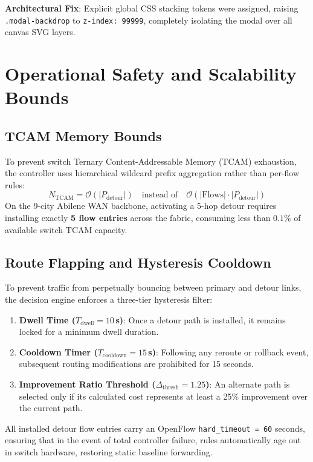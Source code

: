 \textbf{Architectural Fix}: Explicit global CSS stacking tokens were assigned, raising \texttt{.modal-backdrop} to \texttt{z-index: 99999}, completely isolating the modal over all canvas SVG layers.

\section{Operational Safety and Scalability Bounds}

\subsection{TCAM Memory Bounds}
To prevent switch Ternary Content-Addressable Memory (TCAM) exhaustion, the controller uses hierarchical wildcard prefix aggregation rather than per-flow rules:
\begin{equation}
  N_{\text{TCAM}} = \mathcal{O}(|P_{\text{detour}}|) \quad \text{instead of} \quad \mathcal{O}(|\text{Flows}| \cdot |P_{\text{detour}}|)
\end{equation}
On the 9-city Abilene WAN backbone, activating a 5-hop detour requires installing exactly \textbf{5 flow entries} across the fabric, consuming less than $0.1\%$ of available switch TCAM capacity.

\subsection{Route Flapping and Hysteresis Cooldown}
To prevent traffic from perpetually bouncing between primary and detour links, the decision engine enforces a three-tier hysteresis filter:
\begin{enumerate}[noitemsep,topsep=2pt]
  \item \textbf{Dwell Time ($T_{\text{dwell}} = 10$\,s)}: Once a detour path is installed, it remains locked for a minimum dwell duration.
  \item \textbf{Cooldown Timer ($T_{\text{cooldown}} = 15$\,s)}: Following any reroute or rollback event, subsequent routing modifications are prohibited for 15 seconds.
  \item \textbf{Improvement Ratio Threshold ($\Delta_{\text{thresh}} = 1.25$)}: An alternate path is selected only if its calculated cost represents at least a 25\% improvement over the current path.
\end{enumerate}
All installed detour flow entries carry an OpenFlow \texttt{hard\_timeout = 60} seconds, ensuring that in the event of total controller failure, rules automatically age out in switch hardware, restoring static baseline forwarding.
